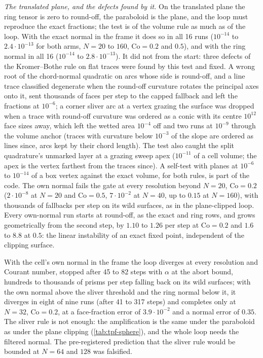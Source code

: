 \documentclass[preprint,12pt]{elsarticle}
\begin{document}
\emph{The translated plane, and the defects found by it.} On the translated plane the ring tensor is zero to round-off, the paraboloid is the plane, and the loop must reproduce the exact fractions; the test is of the volume rule as much as of the loop. With the exact normal in the frame it does so in all 16 runs ($10^{-14}$ to $2.4\cdot10^{-13}$ for both arms, $N = 20$ to $160$, $\mathrm{Co} = 0.2$ and $0.5$), and with the ring normal in all 16 ($10^{-14}$ to $2.8\cdot10^{-13}$). It did not from the start: three defects of the Kromer--Bothe rule on flat traces were found by this test and fixed. A wrong root of the chord-normal quadratic on arcs whose side is round-off, and a line trace classified degenerate when the round-off curvature rotates the principal axes onto it, sent thousands of faces per step to the capped fallback and left the fractions at $10^{-6}$; a corner sliver arc at a vertex grazing the surface was dropped when a trace with round-off curvature was ordered as a conic with its centre $10^{12}$ face sizes away, which left the wetted area $10^{-4}$ off and two runs at $10^{-9}$ through the volume anchor (traces with curvature below $10^{-3}$ of the slope are ordered as lines since, arcs kept by their chord length). The test also caught the split quadrature's unmarked layer at a grazing sweep apex ($10^{-11}$ of a cell volume; the apex is the vertex farthest from the traces since). A self-test with planes at $10^{-6}$ to $10^{-14}$ of a box vertex against the exact volume, for both rules, is part of the code. The own normal fails the gate at every resolution beyond $N = 20$, $\mathrm{Co} = 0.2$ ($2\cdot10^{-8}$ at $N = 20$ and $\mathrm{Co} = 0.5$, $7\cdot10^{-2}$ at $N = 40$, up to $0.15$ at $N = 160$), with thousands of fallbacks per step on its wild surfaces, as in the plane-clipped loop. Every own-normal run starts at round-off, as the exact and ring rows, and grows geometrically from the second step, by $1.10$ to $1.26$ per step at $\mathrm{Co} = 0.2$ and $1.6$ to $8.8$ at $0.5$: the linear instability of an exact fixed point, independent of the clipping surface.

With the cell's own normal in the frame the loop diverges at every resolution and Courant number, stopped after 45 to 82 steps with $\alpha$ at the abort bound, hundreds to thousands of prisms per step falling back on its wild surfaces; with the own normal above the sliver threshold and the ring normal below it, it diverges in eight of nine runs (after 41 to 317 steps) and completes only at $N = 32$, $\mathrm{Co} = 0.2$, at a face-fraction error of $3.9\cdot10^{-2}$ and a normal error of $0.35$. The sliver rule is not enough: the amplification is the same under the paraboloid as under the plane clipping (\cref{tab:tpf-sphere}), and the whole loop needs the filtered normal. The pre-registered prediction that the sliver rule would be bounded at $N = 64$ and $128$ was falsified.
\end{document}
